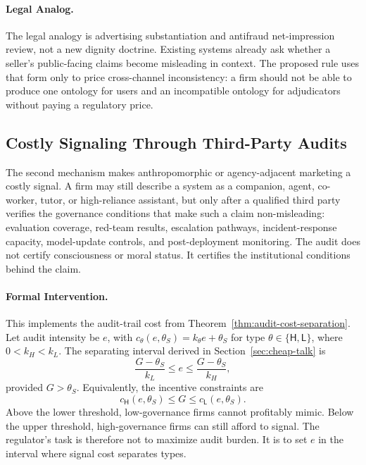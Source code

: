 \documentclass[review,authoryear]{elsarticle}
\theoremstyle{definition}
\theoremstyle{plain}
\begin{document}
\paragraph{Legal Analog.}
The legal analogy is advertising substantiation and antifraud net-impression review, not a new dignity doctrine.  Existing systems already ask whether a seller's public-facing claims become misleading in context.  The proposed rule uses that form only to price cross-channel inconsistency: a firm should not be able to produce one ontology for users and an incompatible ontology for adjudicators without paying a regulatory price.

\subsection{Costly Signaling Through Third-Party Audits}
\label{subsec:costly-signaling-audits}

The second mechanism makes anthropomorphic or agency-adjacent marketing a
costly signal. A firm may still describe a system as a companion, agent,
co-worker, tutor, or high-reliance assistant, but only after a qualified third
party verifies the governance conditions that make such a claim non-misleading:
evaluation coverage, red-team results, escalation pathways, incident-response
capacity, model-update controls, and post-deployment monitoring. The audit does
not certify consciousness or moral status. It certifies the institutional
conditions behind the claim.

\paragraph{Formal Intervention.}
This implements the audit-trail cost from Theorem~\ref{thm:audit-cost-separation}.
Let audit intensity be $e$, with $c_\theta(e,\theta_S)=k_\theta e+\theta_S$ for
type $\theta\in\{\mathsf{H},\mathsf{L}\}$, where $0<k_H<k_L$. The separating
interval derived in Section~\ref{sec:cheap-talk} is
\[
\frac{G-\theta_S}{k_L}\leq e\leq \frac{G-\theta_S}{k_H},
\]
provided $G>\theta_S$. Equivalently, the incentive constraints are
\[
c_\mathsf{H}(e,\theta_S)\leq G \leq c_\mathsf{L}(e,\theta_S).
\]
Above the lower threshold, low-governance firms cannot profitably mimic. Below
the upper threshold, high-governance firms can still afford to signal. The
regulator's task is therefore not to maximize audit burden. It is to set $e$ in
the interval where signal cost separates types.
\end{document}
